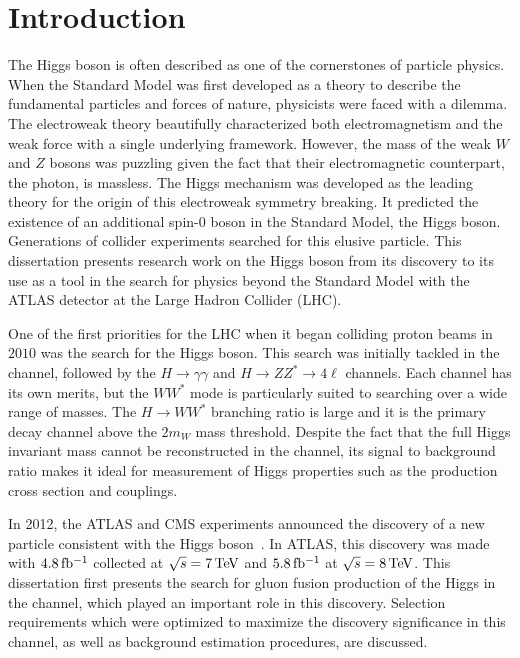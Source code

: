 \chapter{Introduction}
\label{introduction}

The Higgs boson is often described as one of the cornerstones of particle physics. When the Standard Model was first developed as a theory to describe the fundamental particles and forces of nature, physicists were faced with a dilemma. The electroweak theory beautifully characterized both electromagnetism and the weak force with a single underlying framework. However, the mass of the weak $W$ and $Z$ bosons was puzzling given the fact that their electromagnetic counterpart, the photon, is massless. The Higgs mechanism was developed as the leading theory for the origin of this electroweak symmetry breaking. It predicted the existence of an additional spin-$0$ boson in the Standard Model, the Higgs boson. Generations of collider experiments searched for this elusive particle. This dissertation presents research work on the Higgs boson from its discovery to its use as a tool in the search for physics beyond the Standard Model with the ATLAS detector at the Large Hadron Collider (LHC). 

One of the first priorities for the LHC when it began colliding proton beams in $2010$ was the search for the Higgs boson. This search was initially tackled in the \HWWfull channel, followed by the $H\to \gamma\gamma$ and $H\to ZZ^* \to 4\ell $ channels. Each channel has its own merits, but the $WW^*$ mode is particularly suited to searching over a wide range of masses. The $H\to WW^*$ branching ratio is large and it is the primary decay channel above the $2m_W$ mass threshold. Despite the fact that the full Higgs invariant mass cannot be reconstructed in the \HWWfull channel, its signal to background ratio makes it ideal for measurement of Higgs properties such as the production cross section and couplings. 

In 2012, the ATLAS and CMS experiments announced the discovery of a new particle consistent with the Higgs boson~\cite{Discovery,CMSDiscovery}. In ATLAS, this discovery was made with $4.8 \mbox{\,fb$^{-1}$}$ collected at $\sqrt{s} = 7 \TeV$ and $5.8 \mbox{\,fb$^{-1}$}$ at $\sqrt{s} = 8 \TeV$. This dissertation first presents the search for gluon fusion production of the Higgs in the \HWWfull channel, which played an important role in this discovery. Selection requirements which were optimized to maximize the discovery significance in this channel, as well as background estimation procedures, are discussed. 


